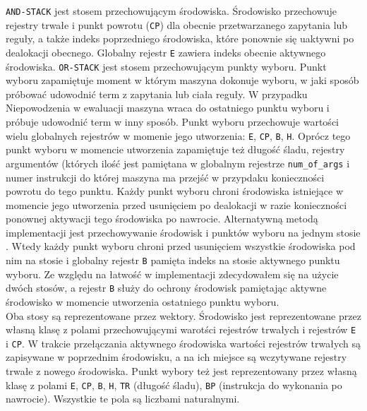 \texttt{AND-STACK} jest stosem przechowującym środowiska. Środowisko przechowuje rejestry trwałe i punkt powrotu (\texttt{CP}) dla obecnie przetwarzanego zapytania lub reguły, a także indeks poprzedniego środowiska, które ponownie się uaktywni po dealokacji obecnego. Globalny rejestr \texttt{E} zawiera indeks obecnie aktywnego środowiska. \texttt{OR-STACK} jest stosem przechowującym punkty wyboru. Punkt wyboru zapamiętuje moment w którym maszyna dokonuje wyboru, w jaki sposób próbować udowodnić term z zapytania lub ciała reguły. W przypadku Niepowodzenia w ewaluacji maszyna wraca do ostatniego punktu wyboru i próbuje udowodnić term w inny sposób. Punkt wyboru przechowuje wartości wielu globalnych rejestrów w momenie jego utworzenia: \texttt{E}, \texttt{CP}, \texttt{B}, \texttt{H}. Oprócz tego punkt wyboru w momencie utworzenia zapamiętuje też długość śladu, rejestry argumentów (których ilość jest pamiętana w globalnym rejestrze \texttt{num\_of\_args} i numer instrukcji do której maszyna ma przejść w przypdaku konieczności powrotu do tego punktu. Każdy punkt wyboru chroni środowiska istniejące w momencie jego utworzenia przed usunięciem po dealokacji w razie konieczności ponownej aktywacji tego środowiska po nawrocie. Alternatywną metodą implementacji jest przechowywanie środowisk i punktów wyboru na jednym stosie \cite{WAM}. Wtedy każdy punkt wyboru chroni przed usunięciem wszystkie środowiska pod nim na stosie i globalny rejestr \texttt{B} pamięta indeks na stosie aktywnego punktu wyboru. Ze względu na łatwość w implementacji zdecydowałem się na użycie dwóch stosów, a rejestr \texttt{B} służy do ochrony środowisk pamiętając aktywne środowisko w momencie utworzenia ostatniego punktu wyboru.\\
Oba stosy są reprezentowane przez wektory. Środowisko jest reprezentowane przez własną klasę z polami przechowującymi warotści rejestrów trwałych i rejestrów \texttt{E} i \texttt{CP}. W trakcie przełączania aktywnego środowiska wartości rejestrów trwałych są zapisywane w poprzednim środowisku, a na ich miejsce są wczytywane rejestry trwałe z nowego środowiska. Punkt wybory też jest reprezentowany przez własną klasę z polami \texttt{E}, \texttt{CP}, \texttt{B}, \texttt{H}, \texttt{TR} (długość śladu), \texttt{BP} (instrukcja do wykonania po nawrocie). Wszystkie te pola są liczbami naturalnymi.
\fi

